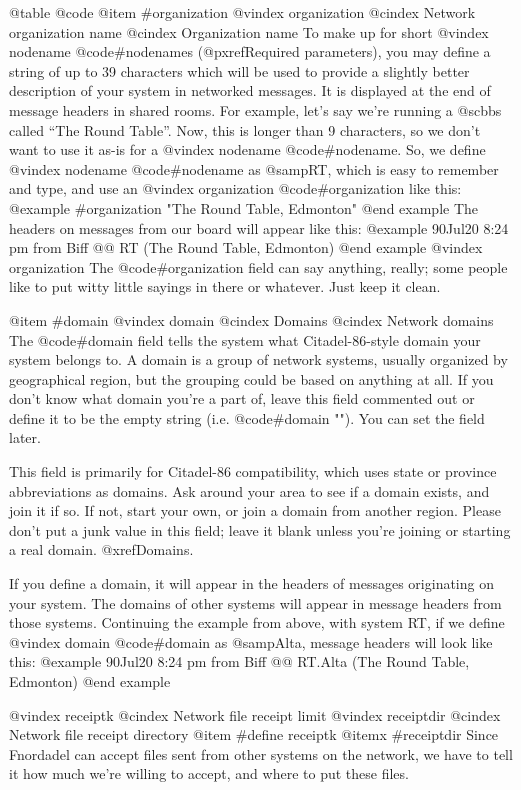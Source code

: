 @table @code
@item #organization
@vindex organization
@cindex Network organization name
@cindex Organization name
To make up for short
@vindex nodename
@code{#nodename}s (@pxref{Required parameters}),
you may define a string of up to 39
characters which will be used to provide a slightly better
description of your system in networked messages.  It is
displayed at the end of message headers in shared rooms.
For example, let's say we're running a @sc{bbs} called
``The Round Table''.  Now, this is longer than 9 characters,
so we don't want to use it as-is for a
@vindex nodename
@code{#nodename}.  So, we define
@vindex nodename
@code{#nodename} as @samp{RT}, which is easy to remember and type, and
use an
@vindex organization
@code{#organization} like this:
@example
#organization "The Round Table, Edmonton"
@end example
The headers on messages from our board will appear
like this:
@example
90Jul20 8:24 pm from Biff @@ RT (The Round Table, Edmonton)
@end example
@vindex organization
The @code{#organization} field can say anything, really;
some people like to put witty little sayings in there or
whatever.  Just keep it clean.

@item #domain
@vindex domain
@cindex Domains
@cindex Network domains
The @code{#domain} field tells the system what Citadel-86-style domain
your system belongs to.  A domain is a group of network systems, usually
organized by geographical region, but the grouping could be based on
anything at all.  If you don't know what domain you're a part of, leave
this field commented out or define it to be the empty string (i.e.
@code{#domain ""}).  You can set the field later.

This field is
primarily for Citadel-86 compatibility, which uses state or province
abbreviations as domains.  Ask around your area to see if a domain exists,
and join it if so.  If not, start your own, or join a domain from another
region.  Please don't put a junk value in this field; leave it blank
unless you're joining or starting a real domain.  @xref{Domains}.

If you define a domain, it will appear in the headers of messages
originating on your system.  The domains of other systems will appear
in message headers from those systems.
Continuing the example from above, with system RT, if we define
@vindex domain
@code{#domain} as @samp{Alta}, message headers will look like this:
@example
90Jul20 8:24 pm from Biff @@ RT.Alta (The Round Table, Edmonton)
@end example

@vindex receiptk
@cindex Network file receipt limit
@vindex receiptdir
@cindex Network file receipt directory
@item #define receiptk
@itemx #receiptdir
Since Fnordadel can accept files sent from other
systems on the network, we have to tell it how much we're
willing to accept, and where to put these files.

